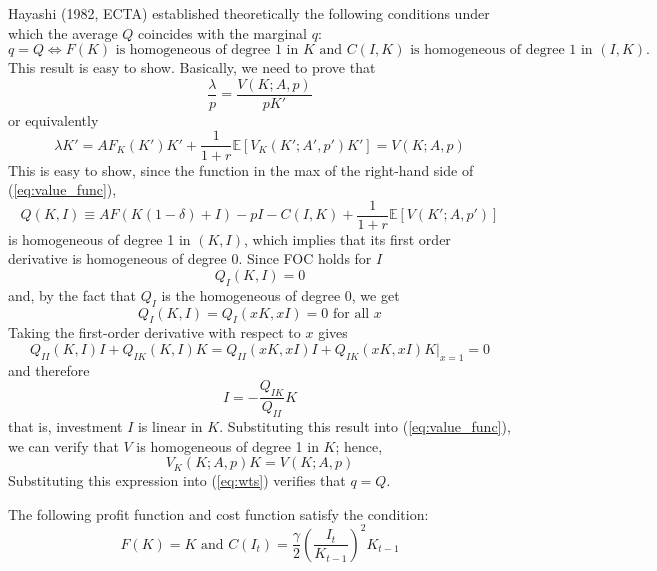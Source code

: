 \documentclass[12pt]{article}
\begin{document}
Hayashi (1982, ECTA) established theoretically the following conditions under which the average $Q$ coincides with the marginal $q$:
\begin{equation}
	q = Q \Leftrightarrow \text{$F(K)$ is homogeneous of degree 1 in $K$ and $C(I, K)$ is homogeneous of degree 1 in $(I,K)$.} 
\end{equation}
This result is easy to show. Basically, we need to prove that
\begin{equation*}
	\frac{\lambda}{p} = \frac{V(K; A, p)}{pK'}
\end{equation*}
or equivalently
\begin{equation} \label{eq:wts}
	\lambda K'= A F_K(K') K' +  \frac{1}{1+r} \mathbb{E}[V_K(K'; A' , p') K'] = V(K; A, p)
\end{equation}
This is easy to show, since the function in the max of the right-hand side of (\ref{eq:value_func}),
\[Q(K, I) \equiv AF(K(1-\delta) + I) - pI - C(I, K) + \frac{1}{1+r} \mathbb{E}[V(K'; A, p')]\]
is homogeneous of degree 1 in $(K, I)$, which implies that its first order derivative is homogeneous of degree 0. Since FOC holds for $I$
\begin{equation}
	Q_I(K, I) = 0
\end{equation} 
and, by the fact that $Q_I$ is the homogeneous of degree 0, we get
\begin{equation*}
	Q_I(K, I) = Q_I( xK, xI) = 0 \text{ for all $x$}
\end{equation*}
Taking the first-order derivative with respect to $x$ gives
\begin{equation}
	Q_{II}(K, I) I + Q_{IK} (K, I) K = Q_{II}(xK, xI) I + Q_{IK} (xK, xI) K \big|_{x = 1} = 0
\end{equation}
and therefore
\begin{equation}
	I = - \frac{Q_{IK}}{Q_{II}} K
\end{equation}
that is, investment $I$ is linear in $K$. Substituting this result into (\ref{eq:value_func}), we can verify that $V$ is homogeneous of degree 1 in $K$; hence,
\[V_K(K; A, p) K = V(K; A,  p)\]
Substituting this expression into (\ref{eq:wts}) verifies that $q = Q$. 

The following profit function and cost function satisfy the condition:
\begin{equation} \label{eq:linear_quadratic}
	F(K) = K \text{ and } C(I_t) = \frac{\gamma}{2} \left(\frac{I_t}{K_{t-1}}\right)^2 K_{t-1}
\end{equation}
\end{document}
